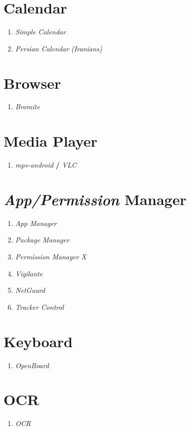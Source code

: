 \documentclass[12pt , a4paper]{article}
\begin{document}
\section{Calendar}
\begin{enumerate}
	\item \emph{Simple Calendar}
	\item \emph{Persian Calendar} \emph{(Iranians)}
\end{enumerate}

\section{Browser}
\begin{enumerate}
	\item[] \emph{Bromite}
\end{enumerate}

\section{Media Player}
\begin{enumerate}
	\item[] \large{\emph{mpv-android}} \textbf{/} \emph{VLC}
\end{enumerate}

\section{\emph{App/Permission} Manager}
\begin{enumerate}
	\item \emph{App Manager}
	\item \emph{Package Manager}
	\item \emph{Permission Manager X}
	\item \emph{Vigilante}
	\item \emph{NetGuard}
	\item \emph{Tracker Control}
\end{enumerate}

\section{Keyboard}
\begin{enumerate}
	\item[] \emph{OpenBoard}
\end{enumerate}

\section{OCR}
\begin{enumerate}
	\item[] \emph{OCR}
\end{enumerate}
\end{document}
